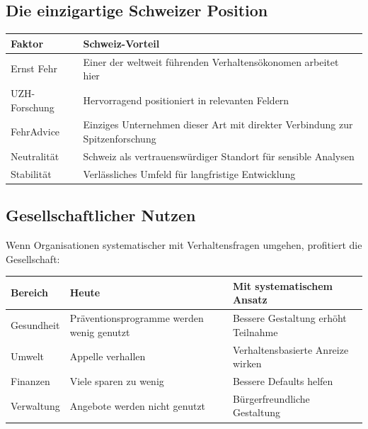 \documentclass[11pt,a4paper]{article}
\begin{document}
\subsection{Die einzigartige Schweizer Position}

\begin{table}[h]
\centering
\begin{tabularx}{\textwidth}{lX}
\toprule
\textbf{Faktor} & \textbf{Schweiz-Vorteil} \\
\midrule
Ernst Fehr & Einer der weltweit führenden Verhaltensökonomen arbeitet hier \\
UZH-Forschung & Hervorragend positioniert in relevanten Feldern \\
FehrAdvice & Einziges Unternehmen dieser Art mit direkter Verbindung zur Spitzenforschung \\
Neutralität & Schweiz als vertrauenswürdiger Standort für sensible Analysen \\
Stabilität & Verlässliches Umfeld für langfristige Entwicklung \\
\bottomrule
\end{tabularx}
\end{table}

\subsection{Gesellschaftlicher Nutzen}

Wenn Organisationen systematischer mit Verhaltensfragen umgehen, profitiert die Gesellschaft:

\begin{table}[h]
\centering
\begin{tabularx}{\textwidth}{lXX}
\toprule
\textbf{Bereich} & \textbf{Heute} & \textbf{Mit systematischem Ansatz} \\
\midrule
Gesundheit & Präventionsprogramme werden wenig genutzt & Bessere Gestaltung erhöht Teilnahme \\
Umwelt & Appelle verhallen & Verhaltensbasierte Anreize wirken \\
Finanzen & Viele sparen zu wenig & Bessere Defaults helfen \\
Verwaltung & Angebote werden nicht genutzt & Bürgerfreundliche Gestaltung \\
\bottomrule
\end{tabularx}
\end{table}
\end{document}
